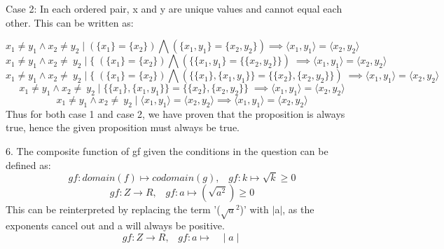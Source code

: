 \documentclass[11pt]{article}
\begin{document}
\begin{enumerate}
\newline 
Case 2: In each ordered pair, x and y are unique values and cannot equal each other. This can be written as: 

\begin{equation}
         x_1 \neq y_1 \land x_2 \neq y_2 \mid  ( \{ x_1\} =  \{ x_2\}) \bigwedge (  \{x_1,  y_1  \}=  \{x_2,  y_2 \} ) \implies  \langle x_1, y_1 \rangle = \langle x_2, y_2 \rangle
\end{equation}
\begin{equation}
      x_1 \neq y_1 \land x_2 \neq \ y_2 \mid \{ \; ( \{ x_1\} =  \{ x_2\}) \bigwedge ( \{ \{x_1,  y_1 \}  =  \{ \{x_2,  y_2 \} \} ) \;  \implies  \langle x_1, y_1 \rangle = \langle x_2, y_2 \rangle
\end{equation}
\begin{equation}
      x_1 \neq y_1 \land x_2 \neq \ y_2 \mid \{ \; ( \{ x_1\} =  \{ x_2\}) \bigwedge ( \{ \{ x_{1} \},  \{x_1,  y_1  \} \}=  \{ \{x_2\}, \{x_2,  y_2 \} \} ) \; \implies  \langle x_1, y_1 \rangle = \langle x_2, y_2 \rangle
\end{equation}
\begin{equation}
      x_1 \neq y_1 \land x_2 \neq \ y_2 \mid  \{ \{ x_{1} \},  \{x_1,  y_1  \} \}=  \{ \{x_2\}, \{x_2,  y_2 \} \}  \; \implies \langle x_1, y_1 \rangle = \langle x_2, y_2 \rangle
\end{equation}
\begin{equation}
          x_1 \neq y_1 \land x_2 \neq \ y_2 \mid  \langle x_1, y_1 \rangle = \langle x_2, y_2 \rangle \implies \langle x_1, y_1 \rangle = \langle x_2, y_2 \rangle
\end{equation}
Thus for both case 1 and case 2, we have proven that the proposition is always true, hence the given proposition must always be true. 
\newpage

6.
\newline
The composite function of gf given the conditions in the question can be defined as: 
\begin{equation}
    gf: domain(f) \longmapsto codomain(g), \;\;\; gf: k \longmapsto \sqrt{k}\geq 0 
\end{equation}
\begin{equation} 
    gf:  Z \rightarrow R,
    \;\;\; gf: a  \longmapsto (\sqrt{a^{2}})\geq 0 
\end{equation}
This can be reinterpreted by replacing the term '($\sqrt{a}$$^{2}$)' with $\mid$a$\mid$, as the exponents cancel out and a will always be positive.
\begin{equation}
    gf:  Z \rightarrow R,
    \;\;\; gf: a \longmapsto \; \; \;  \mid a \mid 
\end{equation}


\end{enumerate}
\end{document}
